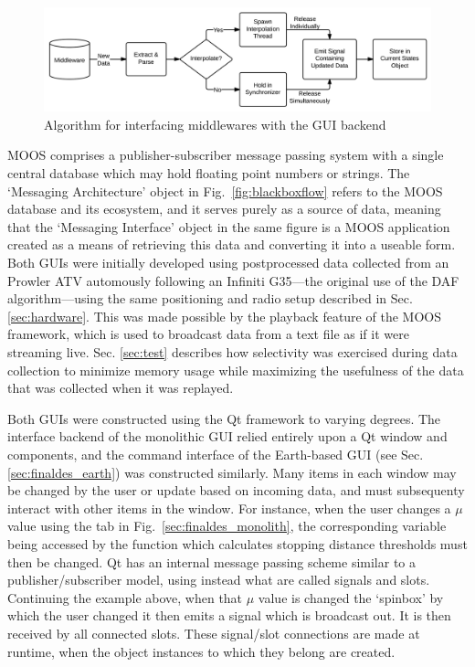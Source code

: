 \begin{figure}[ht] \centering 
    \includegraphics[width=6.5in]{./figs/middleware_diagram.png}
    \caption{Algorithm for interfacing middlewares with the GUI backend} \label{fig:midw_diagram}
\end{figure}

MOOS comprises a publisher-subscriber message passing system with a single central database which may hold floating point numbers or strings. The `Messaging Architecture' object in Fig.~\ref{fig:blackboxflow} refers to the MOOS database and its ecosystem, and it serves purely as a source of data, meaning that the `Messaging Interface' object in the same figure is a MOOS application created as a means of retrieving this data and converting it into a useable form.
Both GUIs were initially developed using postprocessed data collected from an Prowler ATV automously following an Infiniti G35---the original use of the DAF algorithm---using the same positioning and radio setup described in Sec. \ref{sec:hardware}. This was made possible by the playback feature of the MOOS framework, which is used to broadcast data from a text file as if it were streaming live.
Sec. \ref{sec:test} describes how selectivity was exercised during data collection to minimize memory usage while maximizing the usefulness of the data that was collected when it was replayed.

Both GUIs were constructed using the Qt \cite{qt} framework to varying degrees. The interface backend of the monolithic GUI relied entirely upon a Qt window and components, and the command interface of the Earth-based GUI (see Sec. \ref{sec:finaldes_earth}) was constructed similarly. Many items in each window may be changed by the user or update based on incoming data, and must subsequenty interact with other items in the window. For instance, when the user changes a $\mu$ value using the tab in Fig.~\ref{sec:finaldes_monolith}, the corresponding variable being accessed by the function which calculates stopping distance thresholds must then be changed. Qt has an internal message passing scheme similar to a publisher/subscriber model, using instead what are called signals and slots. Continuing the example above, when that $\mu$ value is changed the `spinbox' by which the user changed it then emits a signal which is broadcast out. It is then received by all connected slots. These signal/slot connections are made at runtime, when the object instances to which they belong are created.


